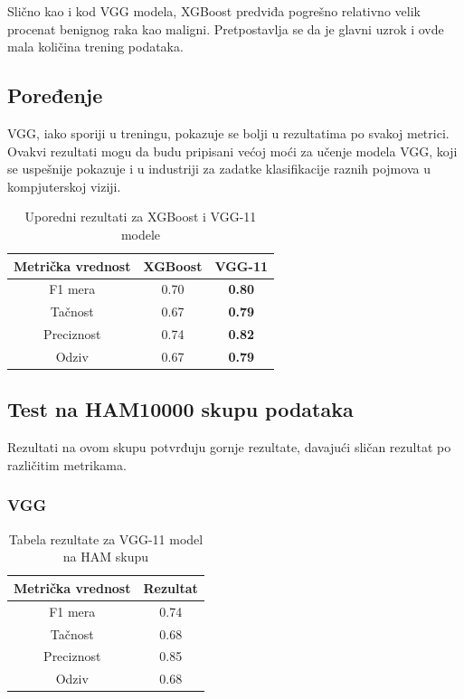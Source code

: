 \documentclass{article}
\begin{document}
Slično kao i kod VGG modela, XGBoost predviđa pogrešno relativno velik procenat benignog raka kao maligni. Pretpostavlja se da je glavni uzrok i ovde mala količina trening podataka.

\subsection{Poređenje}

VGG, iako sporiji u treningu, pokazuje se bolji u rezultatima po svakoj metrici. Ovakvi rezultati mogu da budu pripisani većoj moći za učenje modela VGG, koji se uspešnije pokazuje i u industriji za zadatke klasifikacije raznih pojmova u kompjuterskoj viziji.

\begin{table}[H]
\centering
\begin{tabular}{|c|c|c|}
\hline
\textbf{Metrička vrednost} & \textbf{XGBoost} & \textbf{VGG-11} \\ \hline
F1 mera & 0.70 & \textbf{0.80} \\ \hline
Tačnost & 0.67 & \textbf{0.79} \\ \hline
Preciznost & 0.74 & \textbf{0.82} \\ \hline
Odziv & 0.67 & \textbf{0.79} \\ \hline
\end{tabular}
\caption{Uporedni rezultati za XGBoost i VGG-11 modele}
\label{tab:comparison_performance}
\end{table}

\subsection{Test na HAM10000 skupu podataka}

Rezultati na ovom skupu potvrđuju gornje rezultate, davajući sličan rezultat po različitim metrikama.

\subsubsection{VGG}

\begin{table}[H]
    \centering
    \begin{tabular}{|c|c|}
        \hline
        \textbf{Metrička vrednost} & \textbf{Rezultat} \\ \hline
        F1 mera & 0.74 \\ \hline
        Tačnost & 0.68 \\ \hline
        Preciznost & 0.85 \\ \hline
        Odziv & 0.68 \\ \hline
    \end{tabular}
    \caption{Tabela rezultate za VGG-11 model na HAM skupu}
    \label{tab:xgboost_performance}
\end{table}
\end{document}
